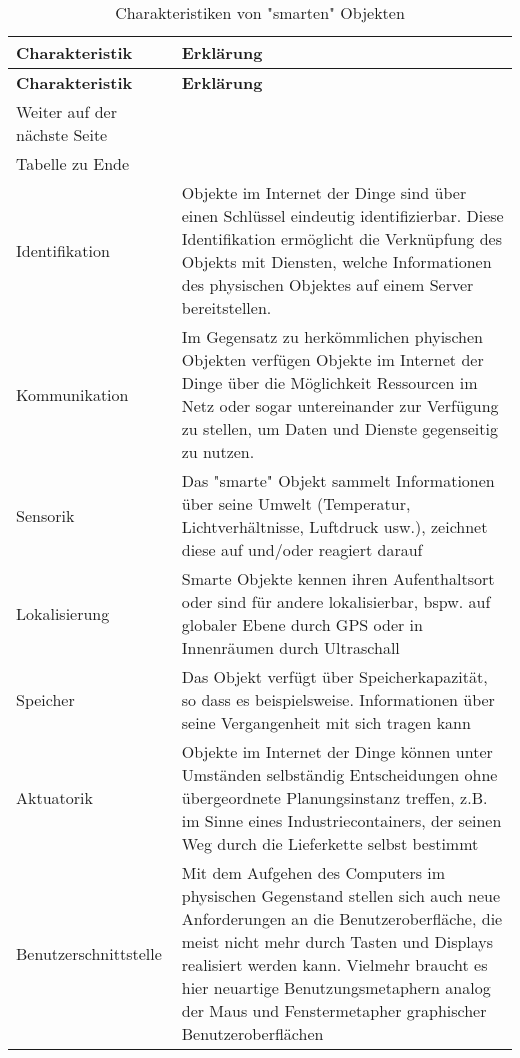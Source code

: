  \begin{longtable}{p{4.5cm}X}
  \caption{Charakteristiken von "smarten" Objekten\cite{iotwiki}}\\
  \label{table:smartObjectsCharacteristics}
  \textbf{Charakteristik} & \textbf{Erklärung}   \\
  \hline
  \endfirsthead %
  \textbf{Charakteristik} & \textbf{Erklärung}  \\
  \hline
  \endhead %
  Weiter auf der n{\"a}chste Seite\\
  \endfoot
  \hline
  Tabelle zu Ende \\
  \endlastfoot
  Identifikation & Objekte im Internet der Dinge sind über einen Schlüssel eindeutig identifizierbar. Diese Identifikation ermöglicht die Verknüpfung des Objekts mit Diensten, welche Informationen des physischen Objektes auf einem Server bereitstellen.
  \\ \hline
  Kommunikation & Im Gegensatz zu herkömmlichen phyischen Objekten verfügen Objekte im Internet der Dinge über die Möglichkeit Ressourcen im Netz oder sogar untereinander zur Verfügung zu stellen, um Daten und Dienste gegenseitig zu nutzen.
  \\ \hline
  Sensorik & Das "smarte" Objekt sammelt Informationen über seine Umwelt (Temperatur, Lichtverhältnisse, Luftdruck usw.), zeichnet diese auf und/oder reagiert darauf
  \\ \hline
  Lokalisierung & Smarte Objekte kennen ihren Aufenthaltsort oder sind für andere lokalisierbar, bspw. auf globaler Ebene durch GPS oder in Innenräumen durch Ultraschall
  \\ \hline
  Speicher & Das Objekt verfügt über Speicherkapazität, so dass es beispielsweise. Informationen über seine Vergangenheit mit sich tragen kann
  \\ \hline
  Aktuatorik & Objekte im Internet der Dinge können unter Umständen selbständig Entscheidungen ohne übergeordnete Planungsinstanz treffen, z.B. im Sinne eines Industriecontainers, der seinen Weg durch die Lieferkette selbst bestimmt
  \\ \hline
  Benutzerschnittstelle & Mit dem Aufgehen des Computers im physischen Gegenstand stellen sich auch neue Anforderungen an die Benutzeroberfläche, die meist nicht mehr durch Tasten und Displays realisiert werden kann. Vielmehr braucht es hier neuartige Benutzungsmetaphern analog der Maus und Fenstermetapher graphischer Benutzeroberflächen
  \\ \hline
 \end{longtable}
